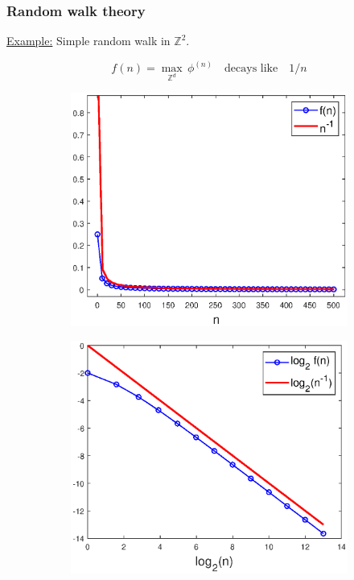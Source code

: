 \documentclass{beamer}
\theoremstyle{definition}
\begin{document}
\begin{frame}
\frametitle{Random walk theory}
\noindent \underline{Example:} Simple random walk in $\mathbb{Z}^2$.

\begin{equation*}
f(n) = \max_{\mathbb{Z}^d}\, \phi^{(n)} \quad \text{decays like} \quad 1/n
\end{equation*}

\vspace{-15pt}
\begin{figure}[!htb]
	\centering
	\begin{subfigure}{0.49\textwidth}
		\centering
		\includegraphics[width=\textwidth]{SRW_ex_11.eps}
	\end{subfigure}
	\begin{subfigure}{0.49\textwidth}
		\centering
		\includegraphics[width=\textwidth]{SRW_ex.eps}
	\end{subfigure}
\end{figure}

\end{frame}
\end{document}
